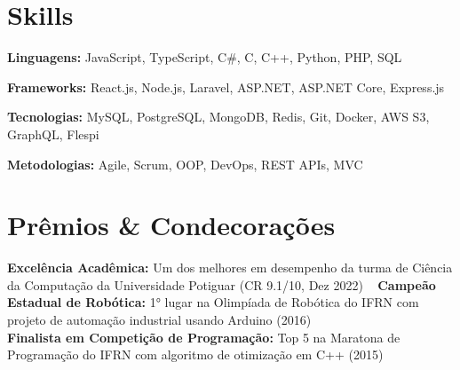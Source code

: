 \documentclass[letterpaper,11pt]{article}
\newcommand{\resumeSubHeadingListStart}{\begin{itemize}[leftmargin=0.15in, label={}]}
\newcommand{\resumeSubHeadingListEnd}{\end{itemize}}
\begin{document}
\section{Skills}
 \vspace{2pt}
 \resumeSubHeadingListStart
   \small{\item{
       
       \textbf{Linguagens:}{ JavaScript, TypeScript, C\#, C, C++, Python, PHP, SQL} \\ \vspace{3pt}
       
       \textbf{Frameworks:}{ React.js, Node.js, Laravel, ASP.NET, ASP.NET Core, Express.js} \\ \vspace{3pt}
       
       \textbf{Tecnologias:}{ MySQL, PostgreSQL, MongoDB, Redis, Git, Docker, AWS S3, GraphQL, Flespi} \\ \vspace{3pt}
       
       \textbf{Metodologias:}{ Agile, Scrum, OOP, DevOps, REST APIs, MVC} \\ \vspace{3pt}
       
   }}
 \resumeSubHeadingListEnd


\section{Prêmios \& Condecorações}
\vspace{2pt}
\resumeSubHeadingListStart
\small{\item{
\textbf{Excelência Acadêmica:} Um dos melhores em desempenho da turma de Ciência da Computação da Universidade Potiguar (CR 9.1/10, Dez 2022) \ \vspace{3pt}
    \textbf{Campeão Estadual de Robótica:} 1° lugar na Olimpíada de Robótica do IFRN com projeto de automação industrial usando Arduino (2016) \\ \vspace{3pt}
    \textbf{Finalista em Competição de Programação:} Top 5 na Maratona de Programação do IFRN com algoritmo de otimização em C++ (2015) \\ \vspace{3pt}    
}}
\resumeSubHeadingListEnd




\end{document}
